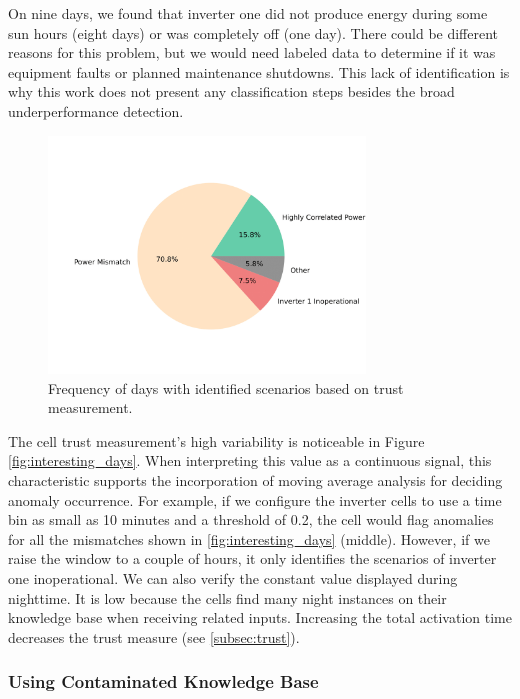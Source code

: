 On nine days, we found that inverter one did not produce energy during some sun hours (eight days) or was completely off (one day). There could be different reasons for this problem, but we would need labeled data to determine if it was equipment faults or planned maintenance shutdowns. This lack of identification is why this work does not present any classification steps besides the broad underperformance detection.

\begin{figure}[h!]
    \centering
    \includegraphics[width=0.75\textwidth,trim={0cm 2cm 0cm 2cm},clip]{figures/chapter5/results/real/situations_freq_pie-1.png}
    \caption{Frequency of days with identified scenarios based on trust measurement.}
    \label{fig:interesting_days_freq}
\end{figure}

The cell trust measurement's high variability is noticeable in Figure \ref{fig:interesting_days}. When interpreting this value as a continuous signal, this characteristic supports the incorporation of moving average analysis for deciding anomaly occurrence. For example, if we configure the inverter cells to use a time bin as small as 10 minutes and a threshold of 0.2, the cell would flag anomalies for all the mismatches shown in \ref{fig:interesting_days} (middle). However, if we raise the window to a couple of hours, it only identifies the scenarios of inverter one inoperational.
We can also verify the constant value displayed during nighttime. It is low because the cells find many night instances on their knowledge base when receiving related inputs. Increasing the total activation time decreases the trust measure (see \ref{subsec:trust}).


\subsubsection{Using Contaminated Knowledge Base}  \label{subsubsec:dirty}



